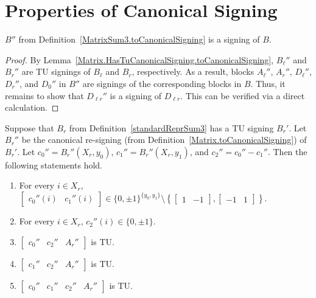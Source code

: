 \section{Properties of Canonical Signing}

\begin{lemma}
    \label{MatrixSum3.HasCanonicalSigning.toCanonicalSigning}
    \leanok
    $B''$ from Definition~\ref{MatrixSum3.toCanonicalSigning} is a signing of $B$.
\end{lemma}

\begin{proof}
    \leanok
    By Lemma~\ref{Matrix.HasTuCanonicalSigning.toCanonicalSigning}, $B_{\ell}''$ and $B_{r}''$ are TU signings of $B_{\ell}$ and $B_{r}$, respectively. As a result, blocks $A_{\ell}''$, $A_{r}''$, $D_{\ell}''$, $D_{r}''$, and $D_{0}''$ in $B''$ are signings of the corresponding blocks in $B$. Thus, it remains to show that $D_{\ell r}''$ is a signing of $D_{\ell r}$. This can be verified via a direct calculation.
\end{proof}

\begin{lemma}
    \label{MatrixSum3.HasTuBr.cccAr_isTotallyUnimodular}
    \leanok
    Suppose that $B_{r}$ from Definition~\ref{standardReprSum3} has a TU signing $B_{r}'$. Let $B_{r}''$ be the canonical re-signing (from Definition~\ref{Matrix.toCanonicalSigning}) of $B_{r}'$. Let $c_{0}'' = B_{r}'' (X_{r}, y_{0})$, $c_{1}'' = B_{r}'' (X_{r}, y_{1})$, and $c_{2}'' = c_{0}'' - c_{1}''$. Then the following statements hold.
    \begin{enumerate}
        \item\label{item:tss_Brp_c01} For every $i \in X_{r}$, $\begin{bmatrix} c_{0}'' (i) & c_{1}'' (i) \end{bmatrix} \in \{0, \pm 1\}^{\{y_{0}, y_{1}\}} \setminus \left\{ \begin{bmatrix} 1 & -1 \end{bmatrix}, \begin{bmatrix} -1 & 1 \end{bmatrix} \right\}$.
        \item\label{item:tss_Brp_c2} For every $i \in X_{r}$, $c_{2}'' (i) \in \{0, \pm 1\}$.
        \item\label{item:tss_Brp_tu1} $\begin{bmatrix} c_{0}'' & c_{2}'' & A_{r}'' \end{bmatrix}$ is TU.
        \item\label{item:tss_Brp_tu2} $\begin{bmatrix} c_{1}'' & c_{2}'' & A_{r}'' \end{bmatrix}$ is TU.
        \item\label{item:tss_Brp_tu3} $\begin{bmatrix} c_{0}'' & c_{1}'' & c_{2}'' & A_{r}'' \end{bmatrix}$ is TU.
    \end{enumerate}
\end{lemma}

